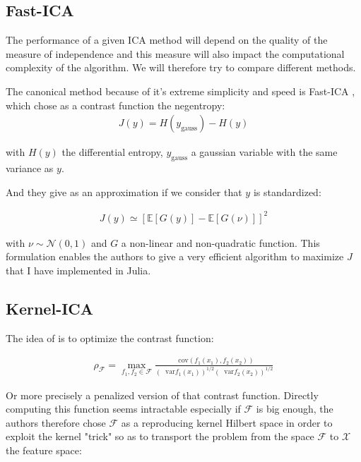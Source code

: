 \documentclass[11pt]{article}
\newcommand*\cov{\mathop{}\!\mathrm{cov}}
\newcommand*\var{\mathop{}\!\mathrm{var}}
\begin{document}
\subsection{Fast-ICA}

The performance of a given ICA method will depend on the quality of the measure of independence and this measure will also impact the computational complexity of the algorithm. We will therefore try to compare different methods.

The canonical method because of it's extreme simplicity and speed is Fast-ICA \cite{Hyvarinen2000}, which chose as a contrast function the negentropy:
\begin{align*}
	J(y) = H(y_\text{gauss}) - H(y)
\end{align*}

with $H(y)$ the differential entropy, $y_\text{gauss}$ a gaussian variable with the same variance as $y$.

And they give as an approximation if we consider that $y$ is standardized:

\begin{align*}
	J(y) \simeq \left[ \mathbb{E} \left[ G(y) \right] - \mathbb{E} \left[ G(\nu) \right] \right]^2
\end{align*}

with $\nu \sim \mathcal{N} (0,1)$ and $G$ a non-linear and non-quadratic function. This formulation enables the authors to give a very efficient algorithm to maximize $J$ that I have implemented in Julia.

\subsection{Kernel-ICA}

The idea of \cite{Bach2002} is to optimize the contrast function:

\begin{align*}
	\rho_{\mathcal{F}} = \max_{f_1, f_2 \in \mathcal{F}} \frac{\cov(f_1 (x_1), f_2(x_2))}{(\var f_1(x_1))^{1/2} (\var f_2(x_2))^{1/2}}
\end{align*}

Or more precisely a penalized version of that contrast function. Directly computing this function seems intractable especially if $\mathcal{F}$ is big enough, the authors therefore chose $\mathcal{F}$ as a reproducing kernel Hilbert space in order to exploit the kernel "trick" so as to transport the problem from the space $\mathcal{F}$ to $\mathcal{X}$ the feature space:
\end{document}
